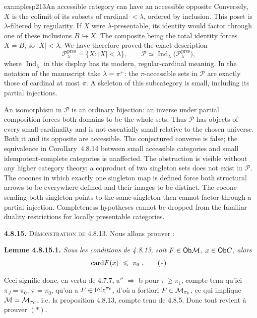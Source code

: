 \begin{dcomment}{examples}{p213}{An accessible category can have an accessible opposite}
Conversely, $X$ is the colimit of its subsets of cardinal $<\lambda$, ordered by inclusion. This poset is $\lambda$-filtered by regularity. If $X$ were $\lambda$-presentable, its identity would factor through one of these inclusions $B\hookrightarrow X$. The composite being the total identity forces $X=B$, so $|X|<\lambda$. We have therefore proved the exact description
\[
 \mathcal P_\lambda^{\mathrm{pres}}
   =\{X:|X|<\lambda\},\qquad
 \mathcal P\simeq
 \operatorname{Ind}_{\lambda}\bigl(\mathcal P_\lambda^{\mathrm{pres}}\bigr),
\]
where $\operatorname{Ind}_{\lambda}$ in this display has its modern, regular-cardinal meaning. In the notation of the manuscript take $\lambda=\pi^+$: the $\pi$-accessible sets in $\mathcal P$ are exactly those of cardinal at most $\pi$. A skeleton of this subcategory is small, including its partial injections.

An isomorphism in $\mathcal P$ is an ordinary bijection: an inverse under partial composition forces both domains to be the whole sets. Thus $\mathcal P$ has objects of every small cardinality and is not essentially small relative to the chosen universe. Both it and its opposite are accessible. The conjectured converse is false; the equivalence in Corollary~4.8.14 between small accessible categories and small idempotent-complete categories is unaffected. The obstruction is visible without any higher category theory: a coproduct of two singleton sets does not exist in $\mathcal P$. The cocones in which exactly one singleton map is defined force both structural arrows to be everywhere defined and their images to be distinct. The cocone sending both singleton points to the same singleton then cannot factor through a partial injection. Completeness hypotheses cannot be dropped from the familiar duality restrictions for locally presentable categories.
\end{dcomment}


\textbf{4.8.15.} \textsc{Démonstration de} 4.8.13. Nous allons prouver :

\textbf{Lemme 4.8.15.1.} \textit{Sous les conditions de 4.8.13, soit $F \in \mathsf{Ob}\mathcal{M}$, $x \in \mathsf{Ob} C$, alors}
\[
\card F(x) \ \leqslant\ \pi_0\ . \tag*{$(*)$}
\]

Ceci signifie donc, en vertu de 4.7.7, a$''$ $\Longrightarrow$ b pour $\pi \geqslant \pi_1$, compte tenu qu'ici $\pi_J = \pi_0$, $\pi = \pi_0$, qu'on a $F \in \mathrm{Filt}^{\pi_0}$, d'où a fortiori $F \in \mathcal{M}_{\pi_0}$, ce qui implique $\mathcal{M} = \mathcal{M}_{\pi_0}$, i.e. la proposition 4.8.13, compte tenu de 4.8.5. Donc tout revient à prouver $(*)$.


